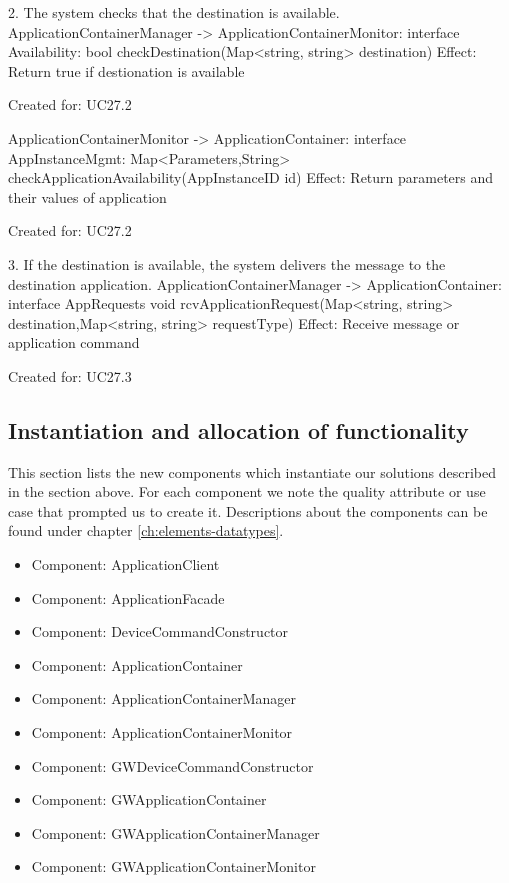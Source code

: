         2. The system checks that the destination is available.
            ApplicationContainerManager -> ApplicationContainerMonitor: interface Availability:
                                                bool checkDestination(Map<string, string>  destination)
                   Effect: Return true if destionation is available
                   \item Created for: UC27.2

            ApplicationContainerMonitor -> ApplicationContainer: interface AppInstanceMgmt:
            Map<Parameters,String> checkApplicationAvailability(AppInstanceID id)
                    Effect: Return parameters and their values of application
                   \item Created for: UC27.2

        3. If the destination is available, the system delivers the message to the destination application.
            ApplicationContainerManager -> ApplicationContainer: interface AppRequests
                               void rcvApplicationRequest(Map<string, string> destination,Map<string, string> requestType)
                   Effect: Receive message or application command
                   \item Created for: UC27.3

\subsection{Instantiation and allocation of functionality}
    This section lists the new components which instantiate our solutions
    described in the section above. For each component we note the quality
    attribute or use case that prompted us to create it. Descriptions about
    the components can be found under chapter \ref{ch:elements-datatypes}. \\

    \begin{itemize}
        \item Component: ApplicationClient
        \item Component: ApplicationFacade
        \item Component: DeviceCommandConstructor
        \item Component: ApplicationContainer
        \item Component: ApplicationContainerManager
        \item Component: ApplicationContainerMonitor
        \item Component: GWDeviceCommandConstructor
        \item Component: GWApplicationContainer
        \item Component: GWApplicationContainerManager
        \item Component: GWApplicationContainerMonitor
    \end{itemize}


